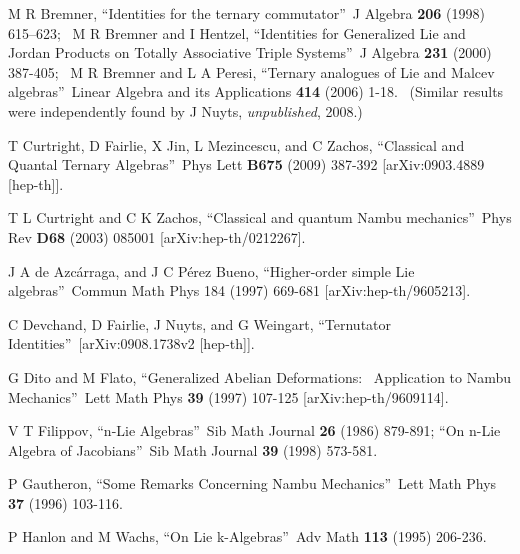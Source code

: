 \documentclass[aps,preprint,tightenlines,unsortedaddress,11pt]{revtex4}\usepackage{amsfonts}
\begin{document}
\begin{thebibliography}{99}                                                                                               

M R Bremner, \textquotedblleft Identities for the ternary
commutator\textquotedblright\ J Algebra \textbf{206} (1998) 615--623; \ M R
Bremner and I Hentzel, \textquotedblleft Identities for Generalized Lie and
Jordan Products on Totally Associative Triple Systems\textquotedblright\ J
Algebra \textbf{231} (2000) 387-405; \ M R Bremner and L A Peresi,
\textquotedblleft Ternary analogues of Lie and Malcev
algebras\textquotedblright\ Linear Algebra and its Applications \textbf{414}
(2006) 1-18. \ (Similar results were independently found by J Nuyts,
\emph{unpublished}, 2008.)

T Curtright, D Fairlie, X Jin, L Mezincescu, and C Zachos,
\textquotedblleft Classical and Quantal Ternary Algebras\textquotedblright\ Phys Lett \textbf{B675} (2009) 387-392 [arXiv:0903.4889 [hep-th]].


T L Curtright and C K Zachos, \textquotedblleft Classical
and quantum Nambu mechanics\textquotedblright\ Phys Rev \textbf{D68} (2003)
085001 [arXiv:hep-th/0212267].


J A de Azc\'{a}rraga, and J C P\'{e}rez Bueno,
\textquotedblleft Higher-order simple Lie algebras\textquotedblright\ Commun
Math Phys 184 (1997) 669-681 [arXiv:hep-th/9605213].

C Devchand, D Fairlie, J Nuyts, and G Weingart,
\textquotedblleft Ternutator Identities\textquotedblright\ [arXiv:0908.1738v2 [hep-th]].

G Dito and M Flato, \textquotedblleft Generalized Abelian
Deformations: \ Application to Nambu Mechanics\textquotedblright\ Lett Math
Phys \textbf{39} (1997) 107-125 [arXiv:hep-th/9609114].

V T Filippov, \textquotedblleft n-Lie
Algebras\textquotedblright\ Sib Math Journal \textbf{26} (1986) 879-891;
\textquotedblleft On n-Lie Algebra of Jacobians\textquotedblright\ Sib Math
Journal \textbf{39} (1998) 573-581.

P Gautheron, \textquotedblleft Some Remarks Concerning
Nambu Mechanics\textquotedblright\ Lett Math Phys \textbf{37} (1996) 103-116.

P Hanlon and M Wachs, \textquotedblleft On Lie
k-Algebras\textquotedblright\ Adv Math \textbf{113} (1995) 206-236.


\end{thebibliography}
\end{document}
